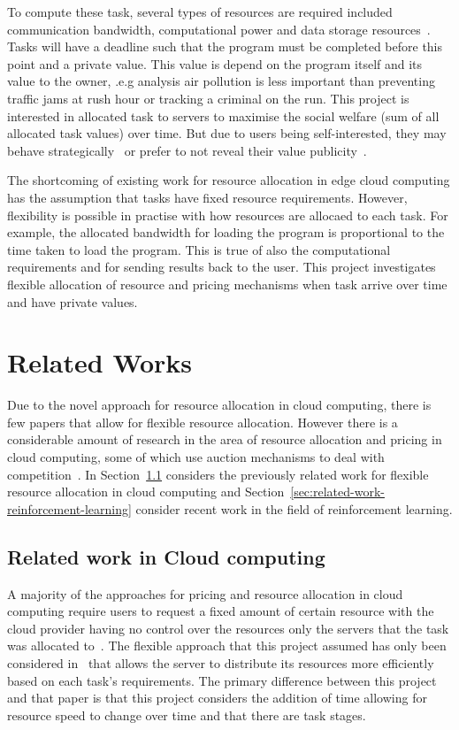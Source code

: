To compute these task, several types of resources are required included communication bandwidth, computational power
and data storage resources~\citep{vaji_infocom}. Tasks will have a deadline such that the program must be completed
before this point and a private value. This value is depend on the program itself and its value to the owner, .e.g analysis air pollution is
less important than preventing traffic jams at rush hour or tracking a criminal on the run. This project is interested
in allocated task to servers to maximise the social welfare (sum of all allocated task values) over time. But due to users being
self-interested, they may behave strategically~\citep{Bi2019} or prefer to not reveal their value publicity~\citep{Pai2013}.

The shortcoming of existing work for resource allocation in edge cloud computing \citep{vaji_infocom, Bi2019}
has the assumption that tasks have fixed resource requirements. However, flexibility is possible in practise
with how resources are allocaed to each task. For example, the allocated bandwidth for loading the program is
proportional to the time taken to load the program. This is true of also the computational requirements and
for sending results back to the user. This project investigates flexible allocation of resource and pricing
mechanisms when task arrive over time and have private values.

\chapter{Related Works}\label{ch:related-works}
Due to the novel approach for resource allocation in cloud computing, there is few papers that allow for flexible
resource allocation. However there is a considerable amount of research in the area of resource allocation and
pricing in cloud computing, some of which use auction mechanisms to deal with competition~\cite{KUMAR2017234,Zhang2017,Du2019,Bi2019}.
In Section~\ref{sec:related-work-cloud-computing} considers the previously related work for flexible resource
allocation in cloud computing and Section~\ref{sec:related-work-reinforcement-learning} consider recent
work in the field of reinforcement learning.

\section{Related work in Cloud computing}\label{sec:related-work-cloud-computing}
A majority of the approaches for pricing and resource allocation in cloud computing require users to request a
fixed amount of certain resource with the cloud provider having no control over the resources only the servers that the
task was allocated to~\citep{KUMAR2017234,Zhang2017,Du2019,Bi2019}. The flexible approach that this project
assumed has only been considered in~\cite{FlexibleResourceAllocation} that allows the server to distribute its resources
more efficiently based on each task's requirements. The primary difference between this project and that paper is that this
project considers the addition of time allowing for resource speed to change over time and that there are task stages.

